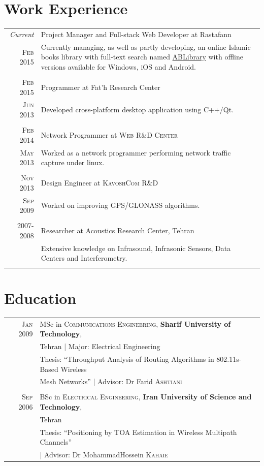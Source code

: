 \documentclass[a4paper,10pt]{article}
\begin{document}
\section{Work Experience}
\begin{tabular}{r|p{11cm}}
\emph{Current} &Project Manager and Full-stack Web Developer at Rastafann\\\textsc{Feb 2015}& \footnotesize{Currently managing, as well as partly developing, an online Islamic books library  with full-text search named \href{https://ablibrary.net}{ABLibrary} with offline versions available for Windows, iOS and Android.}\\\multicolumn{2}{c}{} \\
\textsc{Feb 2015} &Programmer at Fat'h Research Center\\\textsc{Jun 2013}& \footnotesize{Developed cross-platform desktop application using C++/Qt.}\\\multicolumn{2}{c}{} \\
\textsc{Feb 2014} & Network Programmer at \textsc{Web R\&D Center}\\\textsc{May 2013}& \footnotesize{Worked as a network programmer performing network traffic capture under linux.}\\\multicolumn{2}{c}{} \\
 \textsc{Nov 2013} & Design Engineer at \textsc{KavoshCom R\&D} \\\textsc{Sep 2009}&\footnotesize{Worked on improving GPS/GLONASS algorithms.}\\\multicolumn{2}{c}{} \\
\textsc{2007-2008} & Researcher at Acoustics Research Center, Tehran \\&\footnotesize{Extensive knowledge on Infrasound, Infrasonic Sensors, Data Centers and Interferometry.}\\\multicolumn{2}{c}{}
\end{tabular}

\section{Education}
\begin{tabular}{rl}	
 \textsc{Jan} 2009 & MSc in \textsc{Communications Engineering}, \textbf{Sharif University of Technology}, \\
& Tehran | Major: Electrical Engineering\\
& Thesis: ``Throughput Analysis of Routing Algorithms in 802.11s-Based Wireless \\
& Mesh Networks'' | \small Advisor: Dr Farid \textsc{Ashtiani}
\\&\\
\textsc{Sep} 2006 & BSc in \textsc{Electrical Engineering}, \normalsize\textbf{Iran University of Science and Technology}, \\
& \normalsize Tehran\\
& Thesis: ``Positioning by TOA Estimation in Wireless Multipath Channels''\\
& | \small Advisor: Dr MohammadHossein \textsc{Kahaie}
\end{tabular}
\end{document}

